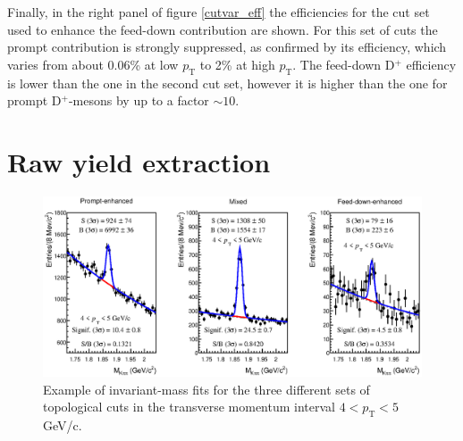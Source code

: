 \documentclass[b5paper,10pt,twoside,oldstyle,classica]{toptesi}
\newcommand{\pt}{p_\text{T}}
\begin{document}
Finally, in the right panel of figure \ref{cutvar_eff} the efficiencies for the cut set used to enhance the feed-down contribution are shown. For this set of cuts the prompt contribution is strongly suppressed, as confirmed by its efficiency, which varies from about 0.06\% at low $\pt$ to 2\% at high $\pt$. The feed-down D$^+$ efficiency is lower than the one in the second cut set, however it is higher than the one for prompt D$^+$-mesons by up to a factor $\sim 10$.
\section{Raw yield extraction}
\label{cutvar_rawyields}
\begin{figure}[tb]
\begin{center}
\includegraphics[scale = 0.65]{Mass3Set_4-5.eps}
\caption{Example of invariant-mass fits for the three different sets of topological cuts in the transverse momentum interval $4<\pt<5$ GeV/c.}
\label{cutvar_massfits}
\end{center}
\end{figure}
\end{document}
